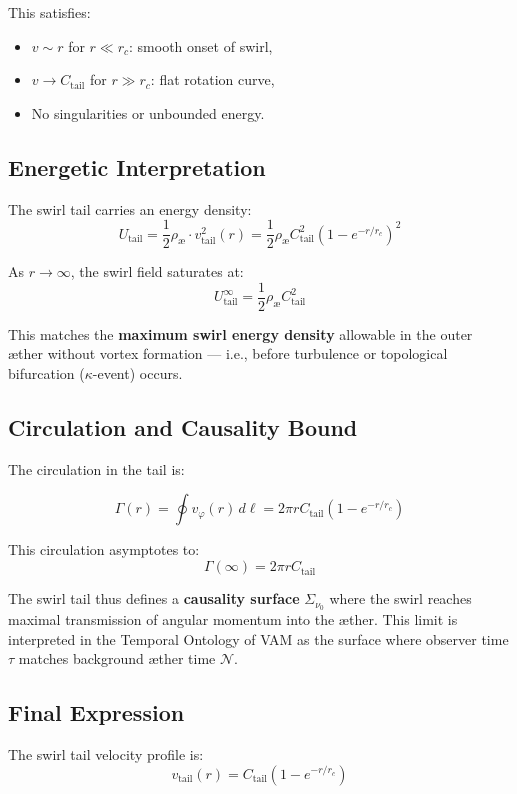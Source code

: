 \documentclass[12pt]{article}
\begin{document}
This satisfies:
\begin{itemize}
    \item \( v \sim r \) for \( r \ll r_c \): smooth onset of swirl,
    \item \( v \to C_{\text{tail}} \) for \( r \gg r_c \): flat rotation curve,
    \item No singularities or unbounded energy.
\end{itemize}

\subsection{Energetic Interpretation}

The swirl tail carries an energy density:
\[
U_{\text{tail}} = \frac{1}{2} \rho_{\text{\ae}} \cdot v_\text{tail}^2(r)
= \frac{1}{2} \rho_{\text{\ae}} C_{\text{tail}}^2 \left(1 - e^{-r/r_c} \right)^2
\]

As \( r \to \infty \), the swirl field saturates at:
\[
U_{\text{tail}}^\infty = \frac{1}{2} \rho_{\text{\ae}} C_{\text{tail}}^2
\]

This matches the \textbf{maximum swirl energy density} allowable in the outer æther without vortex formation — i.e., before turbulence or topological bifurcation (\( \kappa \)-event) occurs.

\subsection{Circulation and Causality Bound}

The circulation in the tail is:

\[
\Gamma(r) = \oint v_\varphi(r) \, d\ell = 2\pi r C_{\text{tail}} (1 - e^{-r/r_c})
\]

This circulation asymptotes to:
\[
\Gamma(\infty) = 2\pi r C_{\text{tail}}
\]

The swirl tail thus defines a \textbf{causality surface} \( \Sigma_{\nu_0} \) where the swirl reaches maximal transmission of angular momentum into the æther. This limit is interpreted in the Temporal Ontology of VAM as the surface where observer time \( \tau \) matches background æther time \( \mathcal{N} \).

\subsection{Final Expression}

The swirl tail velocity profile is:
\[
\boxed{
v_\text{tail}(r) = C_{\text{tail}} \left(1 - e^{-r/r_c} \right)
}
\]
\end{document}

